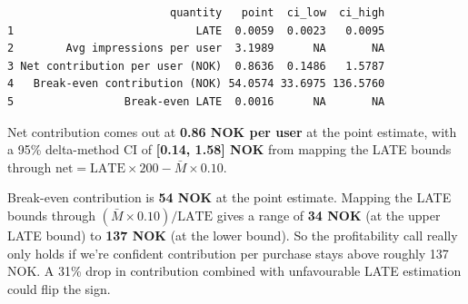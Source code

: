 \begin{Shaded}
\begin{Highlighting}[]
\OtherTok{\textless{}{-}}\SpecialCharTok{*}\SpecialCharTok{/}

\OtherTok{\textless{}{-}} \NormalTok{(}
   \NormalTok{(}\NormalTok{,}
               \NormalTok{,}
               \NormalTok{,}
               \NormalTok{,}
               \NormalTok{),}
   
   \NormalTok{),}
   \NormalTok{)}
\NormalTok{)}
\NormalTok{profit\_table[ , }\SpecialCharTok{{-}}\NormalTok{] }\OtherTok{\textless{}{-}} \NormalTok{(profit\_table[ , }\SpecialCharTok{{-}}\NormalTok{], round, }\NormalTok{)}
\end{Highlighting}
\end{Shaded}

\begin{verbatim}
                         quantity   point  ci_low  ci_high
1                            LATE  0.0059  0.0023   0.0095
2        Avg impressions per user  3.1989      NA       NA
3 Net contribution per user (NOK)  0.8636  0.1486   1.5787
4   Break-even contribution (NOK) 54.0574 33.6975 136.5760
5                 Break-even LATE  0.0016      NA       NA
\end{verbatim}

Net contribution comes out at \textbf{0.86 NOK per user} at the point
estimate, with a 95\% delta-method CI of \textbf{{[}0.14, 1.58{]} NOK}
from mapping the LATE bounds through
\(\text{net} = \text{LATE} \times 200 - \bar M \times 0.10\).

Break-even contribution is \textbf{54 NOK} at the point estimate.
Mapping the LATE bounds through \((\bar M \times 0.10)/\text{LATE}\)
gives a range of \textbf{34 NOK} (at the upper LATE bound) to
\textbf{137 NOK} (at the lower bound). So the profitability call really
only holds if we're confident contribution per purchase stays above
roughly 137 NOK. A 31\% drop in contribution combined with unfavourable
LATE estimation could flip the sign.


